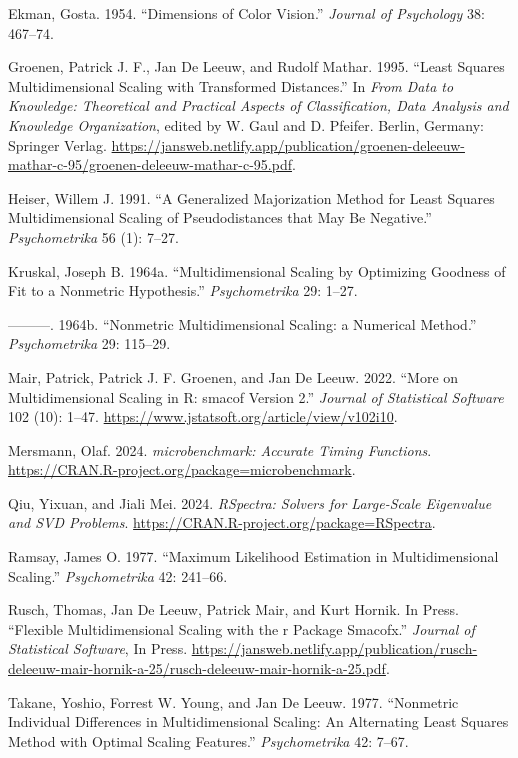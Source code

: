 \documentclass[
  12pt,
  letterpaper,
  DIV=11,
  numbers=noendperiod]{scrartcl}
\newlength{\cslhangindent}
\newenvironment{CSLReferences}[2] %
 {\begin{list}{}{%
  \setlength{\itemindent}{0pt}
  \setlength{\leftmargin}{0pt}
  \setlength{\parsep}{0pt}
  \ifodd #1
   \setlength{\leftmargin}{\cslhangindent}
   \setlength{\itemindent}{-1\cslhangindent}
  \fi
  \setlength{\itemsep}{#2\baselineskip}}}
 {\end{list}}
\begin{document}
\begin{CSLReferences}{1}{0}
Ekman, Gosta. 1954. {``{Dimensions of Color Vision}.''} \emph{Journal of
Psychology} 38: 467--74.

Groenen, Patrick J. F., Jan De Leeuw, and Rudolf Mathar. 1995. {``{Least
Squares Multidimensional Scaling with Transformed Distances}.''} In
\emph{{From Data to Knowledge: Theoretical and Practical Aspects of
Classification, Data Analysis and Knowledge Organization}}, edited by W.
Gaul and D. Pfeifer. Berlin, Germany: Springer Verlag.
\url{https://jansweb.netlify.app/publication/groenen-deleeuw-mathar-c-95/groenen-deleeuw-mathar-c-95.pdf}.

Heiser, Willem J. 1991. {``{A Generalized Majorization Method for Least
Squares Multidimensional Scaling of Pseudodistances that May Be
Negative}.''} \emph{Psychometrika} 56 (1): 7--27.

Kruskal, Joseph B. 1964a. {``{Multidimensional Scaling by Optimizing
Goodness of Fit to a Nonmetric Hypothesis}.''} \emph{Psychometrika} 29:
1--27.

---------. 1964b. {``{Nonmetric Multidimensional Scaling: a Numerical
Method}.''} \emph{Psychometrika} 29: 115--29.

Mair, Patrick, Patrick J. F. Groenen, and Jan De Leeuw. 2022. {``{More
on Multidimensional Scaling in R: smacof Version 2}.''} \emph{Journal of
Statistical Software} 102 (10): 1--47.
\url{https://www.jstatsoft.org/article/view/v102i10}.

Mersmann, Olaf. 2024. \emph{{microbenchmark: Accurate Timing
Functions}}. \url{https://CRAN.R-project.org/package=microbenchmark}.

Qiu, Yixuan, and Jiali Mei. 2024. \emph{{RSpectra: Solvers for
Large-Scale Eigenvalue and SVD Problems}}.
\url{https://CRAN.R-project.org/package=RSpectra}.

Ramsay, James O. 1977. {``{Maximum Likelihood Estimation in
Multidimensional Scaling}.''} \emph{Psychometrika} 42: 241--66.

Rusch, Thomas, Jan De Leeuw, Patrick Mair, and Kurt Hornik. In Press.
{``Flexible Multidimensional Scaling with the r Package Smacofx.''}
\emph{Journal of Statistical Software}, In Press.
\url{https://jansweb.netlify.app/publication/rusch-deleeuw-mair-hornik-a-25/rusch-deleeuw-mair-hornik-a-25.pdf}.

Takane, Yoshio, Forrest W. Young, and Jan De Leeuw. 1977. {``Nonmetric
Individual Differences in Multidimensional Scaling: An Alternating Least
Squares Method with Optimal Scaling Features.''} \emph{Psychometrika}
42: 7--67.

\end{CSLReferences}
\end{document}
